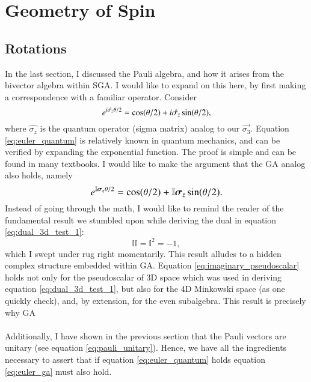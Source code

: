 

\section{Geometry of Spin}

\subsection{Rotations}
In the last section, I discussed the Pauli algebra, and how it arises from the bivector algebra within SGA. I would like to expand on this here, by first making a correspondence with a familiar operator. Consider
\begin{equation} \label{eq:euler_quantum}
	\large  \exp{i \hat{\sigma_z} \theta / 2} = \cos(\theta/2) + i \hat{\sigma_z} \sin(\theta/2),
\end{equation}
where $\hat{\sigma_z} $ is the quantum operator (sigma matrix) analog to our $\vec{\sigma_3}$. Equation \eqref{eq:euler_quantum} is relatively known in quantum mechanics, and can be verified by expanding the exponential function. The proof is simple and can be found in many textbooks. I would like to make the argument that the GA analog also holds, namely
\begin{equation} \label{eq:euler_ga}
	\large  \exp{ \mathbb{I} \vec{\sigma_z} \theta / 2} = \cos(\theta/2) + \mathbb{I} \vec{\sigma_z} \sin(\theta/2).
\end{equation}
Instead of going through the math, I would like to remind the reader of the fundamental result we stumbled upon while deriving the dual in equation \eqref{eq:dual_3d_test_1}:
\begin{equation} \label{eq:imaginary_pseudoscalar}
	\mathbb{I}  \mathbb{I} = \mathbb{I} ^2 = -1,
\end{equation}
which I swept under rug right momentarily. This result alludes to a hidden complex structure embedded within GA. Equation \eqref{eq:imaginary_pseudoscalar} holds not only for the pseudoscalar of 3D space which was used in deriving equation \eqref{eq:dual_3d_test_1}, but also for the 4D Minkowski space (as one quickly check), and, by extension, for the even subalgebra. This result is precisely why GA
\\ \\
Additionally, I have shown in the previous section that the Pauli vectors are unitary (see equation \eqref{eq:pauli_unitary}). Hence, we have all the ingredients necessary to assert that if equation \eqref{eq:euler_quantum} holds equation \eqref{eq:euler_ga} must also hold.
